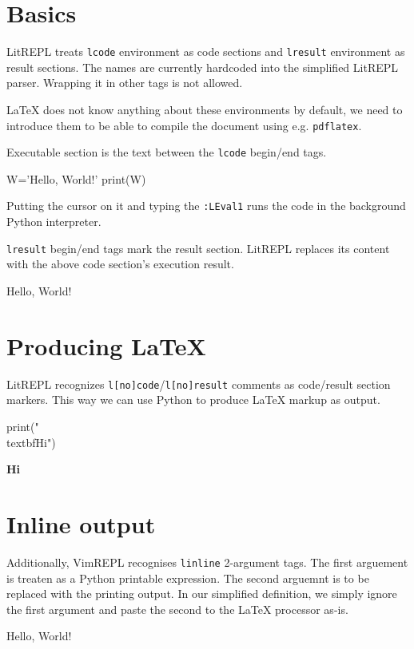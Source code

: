 \documentclass{article}
\begin{document}
\section{Basics}

LitREPL treats \texttt{lcode} environment as code sections and \texttt{lresult}
environment as result sections. The names are currently hardcoded into the
simplified LitREPL parser. Wrapping it in other tags is not allowed.

LaTeX does not know anything about these environments by default, we need to
introduce them to be able to compile the document using e.g. \texttt{pdflatex}.

\newenvironment{lcode}{\verbatim}{\endverbatim}
\newenvironment{lresult}{\verbatim}{\endverbatim}
\newcommand{\linline}[2]{#2}

Executable section is the text between the \texttt{lcode} begin/end tags.

\begin{lcode}
W='Hello, World!'
print(W)
\end{lcode}

Putting the cursor on it and typing the \texttt{:LEval1} runs the code in the
background Python interpreter.

\texttt{lresult} begin/end tags mark the result section.  LitREPL replaces its
content with the above code section's execution result.

\begin{lresult}
Hello, World!
\end{lresult}

\section{Producing LaTeX}

LitREPL recognizes \texttt{l[no]code}/\texttt{l[no]result} comments as
code/result section markers. This way we can use Python to produce LaTeX markup
as output.

\begin{lcode}
print("\\textbf{Hi}")
\end{lcode}

\textbf{Hi}

\section{Inline output}

Additionally, VimREPL recognises \texttt{linline} 2-argument tags. The first
arguement is treaten as a Python printable expression. The second arguemnt is to
be replaced with the printing output. In our simplified definition, we simply
ignore the first argument and paste the second to the LaTeX processor as-is.

\linline{W}{Hello, World!}
\end{document}
